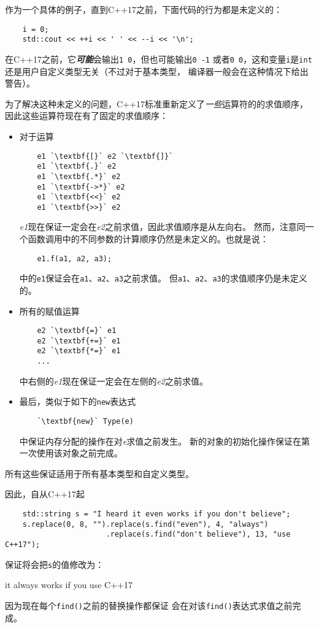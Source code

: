 作为一个具体的例子，直到C++17之前，下面代码的行为都是未定义的：
\begin{lstlisting}
    i = 0;
    std::cout << ++i << ' ' << --i << '\n';
\end{lstlisting}
在C++17之前，它\emph{\textbf{可能}}会输出\texttt{1 0}，但也可能输出\texttt{0 -1}
或者\texttt{0 0}，这和变量\texttt{i}是\texttt{int}还是用户自定义类型无关（不过对于基本类型，
编译器一般会在这种情况下给出警告）。

为了解决这种未定义的问题，C++17标准重新定义了\emph{一些}运算符的的求值顺序，
因此这些运算符现在有了固定的求值顺序：
\begin{itemize}
    \item 对于运算
    \begin{lstlisting}
    e1 `\textbf{[}` e2 `\textbf{]}`
    e1 `\textbf{.}` e2
    e1 `\textbf{.*}` e2
    e1 `\textbf{->*}` e2
    e1 `\textbf{<<}` e2
    e1 `\textbf{>>}` e2
    \end{lstlisting}
    \emph{e1}现在保证一定会在\emph{e2}之前求值，因此求值顺序是从左向右。
    然而，注意同一个函数调用中的不同参数的计算顺序仍然是未定义的。也就是说：
    \begin{lstlisting}
    e1.f(a1, a2, a3);
    \end{lstlisting}
    中的\texttt{e1}保证会在\texttt{a1}、\texttt{a2}、\texttt{a3}之前求值。
    但\texttt{a1}、\texttt{a2}、\texttt{a3}的求值顺序仍是未定义的。
    \item 所有的赋值运算
    \begin{lstlisting}
    e2 `\textbf{=}` e1
    e2 `\textbf{+=}` e1
    e2 `\textbf{*=}` e1
    ...
    \end{lstlisting}
    中右侧的\emph{e1}现在保证一定会在左侧的\emph{e2}之前求值。
    \item 最后，类似于如下的\texttt{new}表达式
    \begin{lstlisting}
    `\textbf{new}` Type(e)
    \end{lstlisting}
    中保证内存分配的操作在对\emph{e}求值之前发生。
    新的对象的初始化操作保证在第一次使用该对象之前完成。
\end{itemize}
所有这些保证适用于所有基本类型和自定义类型。

因此，自从C++17起
\begin{lstlisting}
    std::string s = "I heard it even works if you don't believe";
    s.replace(0, 8, "").replace(s.find("even"), 4, "always")
                       .replace(s.find("don't believe"), 13, "use C++17");
\end{lstlisting}
保证将会把\texttt{s}的值修改为：
\begin{blacklisting}
    it always works if you use C++17
\end{blacklisting}
因为现在每个\texttt{find()}之前的替换操作都保证
会在对该\texttt{find()}表达式求值之前完成。


